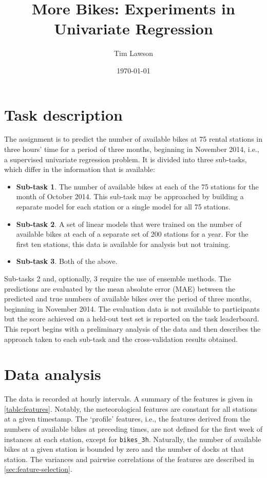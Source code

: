 \documentclass[11pt]{extarticle}
\begin{document}
\title{More Bikes: Experiments in Univariate Regression}
\author{Tim Lawson}
\date{\today}

\maketitle

\section{Task description}

The assignment is to predict the number of available bikes at 75 rental stations in
three hours' time for a period of three months, beginning in November 2014, i.e., a
supervised univariate regression problem.
It is divided into three sub-tasks, which differ in the information that is available:
\begin{itemize}
  \item \textbf{Sub-task 1}.
        The number of available bikes at each of the 75 stations for the month of October 2014.
        This sub-task may be approached by building a separate model for each station or a
        single model for all 75 stations.
  \item \textbf{Sub-task 2}.
        A set of linear models that were trained on the number of available bikes at each of a
        separate set of 200 stations for a year.
        For the first ten stations, this data is available for analysis but not training.
  \item \textbf{Sub-task 3}.
        Both of the above.
\end{itemize}
Sub-tasks 2 and, optionally, 3 require the use of ensemble methods.
The predictions are evaluated by the mean absolute error (MAE) between the predicted
and true numbers of available bikes over the period of three months, beginning in
November 2014.
The evaluation data is not available to participants but the score achieved on a
held-out test set is reported on the task leaderboard.
This report begins with a preliminary analysis of the data and then describes the
approach taken to each sub-task and the cross-validation results obtained.

\section{Data analysis}
\label{sec:data-analysis}

The data is recorded at hourly intervals.
A summary of the features is given in \cref{table:features}.
Notably, the meteorological features are constant for all stations at a given timestamp.
The `profile' features, i.e., the features derived from the numbers of available bikes
at preceding times, are not defined for the first week of instances at each station,
except for \texttt{bikes\_3h}.
Naturally, the number of available bikes at a given station is bounded by zero and the
number of docks at that station.
The variances and pairwise correlations of the features are described in \cref{sec:feature-selection}.
\end{document}
